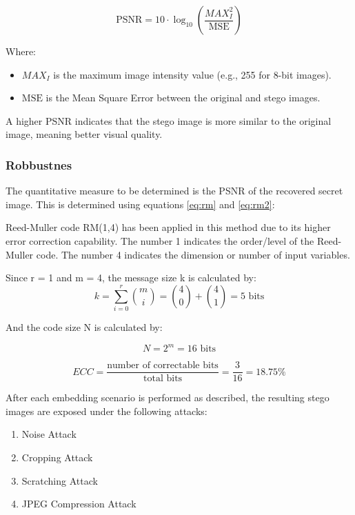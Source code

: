 \documentclass{ittelkom}
\begin{document}
\begin{equation}
    \text{PSNR} = 10 \cdot \log_{10} \left( \frac{MAX_I^2}{\text{MSE}} \right)
\end{equation}

Where:
\begin{itemize}
    \item $MAX_I$ is the maximum image intensity value (e.g., 255 for 8-bit images).
    \item $\text{MSE}$ is the Mean Square Error between the original and stego images.
\end{itemize}

A higher PSNR indicates that the stego image is more similar to the original
image, meaning better visual quality.

\subsubsection{Robbustnes}

The quantitative measure to be determined is the PSNR of the recovered secret
image. This is determined using equations \ref{eq:rm} and \ref{eq:rm2}:

Reed-Muller code RM(1,4) has been applied in this method due to its higher
error correction capability. The number 1 indicates the order/level of the
Reed-Muller code. The number 4 indicates the dimension or number of input
variables.

Since r = 1 and m = 4, the message size k is calculated by:
\begin{equation}
    k = \sum_{i=0}^{r} \binom{m}{i} = \binom{4}{0} + \binom{4}{1} = 5 \text{ bits}
    \label{eq:rm}
\end{equation}

And the code size N is calculated by:

\begin{equation}
    N = 2^m = 16 \text{ bits}
    \label{eq:rm2}
\end{equation}

\begin{equation}
    ECC = \frac{\text{number of correctable bits}}{\text{total bits}} = \frac{3}{16} = 18.75\%
\end{equation}

After each embedding scenario is performed as described, the resulting stego
images are exposed under the following attacks:

\begin{enumerate}
    \item Noise Attack
    \item Cropping Attack
    \item Scratching Attack
    \item JPEG Compression Attack
\end{enumerate}
\end{document}
